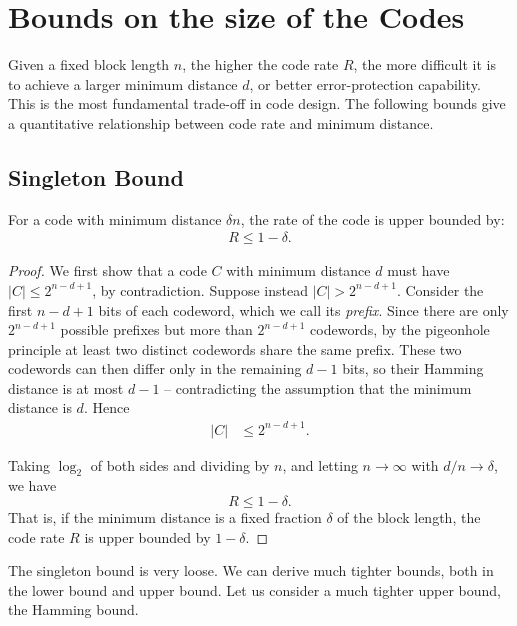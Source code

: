 \section{Bounds on the size of the Codes}
Given a fixed block length \(n\), the higher the code rate \(R\), the more difficult it is to achieve a larger minimum distance \(d\), or better error-protection capability. This is the most fundamental trade-off in code design. The following bounds give a quantitative relationship between code rate and minimum distance. 

\subsection{Singleton Bound}
\begin{theorem}
For a code with minimum distance \(\delta n\), the rate of the code is upper bounded by: 
\begin{align*}
    R \leq 1 - \delta. 
\end{align*}
\end{theorem}

\begin{proof}
We first show that a code \(C\) with minimum distance \(d\) must have \(|C| \leq 2^{n-d+1}\), by contradiction. Suppose instead \(|C| > 2^{n-d+1}\). Consider the first \(n-d+1\) bits of each codeword, which we call its \emph{prefix}. Since there are only \(2^{n-d+1}\) possible prefixes but more than \(2^{n-d+1}\) codewords, by the pigeonhole principle at least two distinct codewords share the same prefix. These two codewords can then differ only in the remaining \(d-1\) bits, so their Hamming distance is at most \(d-1\) -- contradicting the assumption that the minimum distance is \(d\). Hence
\begin{align*}
    |C| &\leq 2^{n-d+1}. 
\end{align*}

Taking \(\log_2\) of both sides and dividing by \(n\), and letting \(n \to \infty\) with \(d/n \to \delta\), we have
\begin{equation}
    R \leq 1- \delta. \label{eq:singletonBound}
\end{equation}
That is, if the minimum distance is a fixed fraction \(\delta\) of the block length, the code rate \(R\) is upper bounded by \(1-\delta\).    
\end{proof}


The singleton bound is very loose. We can derive much tighter bounds, both in the lower bound and upper bound. Let us consider a much tighter upper bound, the Hamming bound.

